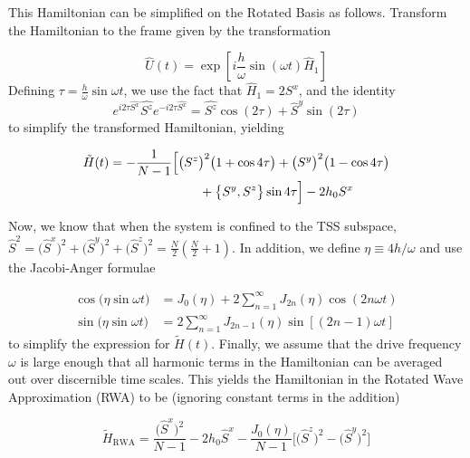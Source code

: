 \documentclass[%
 reprint,
 amsmath,amssymb,
 aps,
]{revtex4-2}
\begin{document}
This Hamiltonian can be simplified on the Rotated Basis as follows. Transform the Hamiltonian to the frame given by the transformation

\begin{equation}
	\hat{U}(t)=\exp \left[i \frac{h}{\omega} \sin (\omega t) \hat{H}_{1}\right]
\end{equation}
Defining $\tau = \displaystyle\frac{h}{\omega}\sin{\omega t}$, we use the fact that $\hat{H}_1 = 2 S^x$, and the identity  
\begin{equation}
e^{i 2\tau\hat{S^{x}}} \hat{S^{z}} e^{-i 2\tau \hat{S^{x}}}=\hat{S^{z}} \cos \left(2\tau\right)+\hat{S}^{y} \sin \left(2\tau\right)
\end{equation}
to simplify the transformed Hamiltonian, yielding

\begin{align}
	\tilde{H}(t)& = -\frac{1}{N-1}\Big[\big(S^z\big)^2 \big(1+\cos{4\tau}\big)+ \big(S^y\big)^2 \big(1-\cos{4\tau}\big)\nonumber \\  
	&\hskip 2.5cm + \big\{S^y, S^z\big\}\sin{4\tau}\Big] - 2 h_0 S^x
\end{align}


Now, we know that when the system is confined to the TSS subspace,  $\hat{S}^{2}=\big(\hat{S}^x\big)^{2}+\big(\hat{S}^y\big)^{2}+\big(\hat{S}^z\big)^{2}=\frac{N}{2}\left(\frac{N}{2}+1\right)$. In addition, we define $\eta\equiv 4h/\omega$ and use the Jacobi-Anger formulae ~\cite{noauthor_jacobianger_2022}

\begin{align*}
	\cos \big(\eta \sin\omega t\big) &= J_{0}(\eta)+2 \sum_{n=1}^{\infty} J_{2 n}(\eta) \cos (2 n \omega t) \\
	\sin \big(\eta \sin\omega t\big) &= 2 \sum_{n=1}^{\infty} J_{2 n-1}(\eta)\sin [(2 n-1) \omega t]
\end{align*}
to simplify the expression for $\tilde{H}(t)$. Finally, we assume that the drive frequency $\omega$ is large enough that all harmonic terms in the Hamiltonian can be averaged out over discernible time scales. This yields the Hamiltonian in the Rotated Wave Approximation (RWA) to be (ignoring constant terms in the addition)

\begin{equation}
	\tilde{H}_{\mathrm{RWA}}= \frac{\big(\hat{S}^x\big)^{2}}{N-1} - 2h_0 \hat{S}^x - \frac{J_0(\eta)}{N-1}\bigg[\big(\hat{S}^z\big)^{2} - \big(\hat{S}^y\big)^{2} \bigg]
\end{equation}
\end{document}
